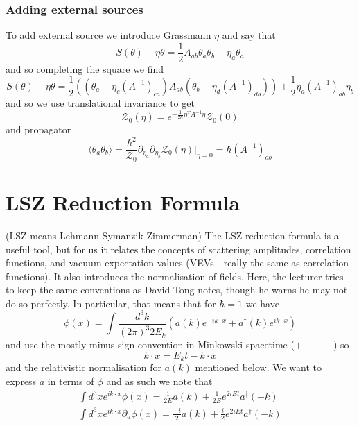\documentclass{article}
\theoremstyle{definition}
\begin{document}
\subsubsection{Adding external sources}

To add external source we introduce Grassmann $\eta$ and say that
\begin{equation}
  S(\theta) - \eta \theta = \frac{1}{2} A_{ab} \theta_a \theta_b - \eta_a \theta_a
\end{equation}
and so completing the square we find
\begin{equation}
  S(\theta) - \eta \theta = \frac{1}{2} ((\theta_a - \eta_c (A^{-1})_{ca}) A_{ab}
  (\theta_b - \eta_d (A^{-1})_{db})) + \frac{1}{2} \eta_a (A^{-1})_{ab} \eta_b
\end{equation}
and so we use translational invariance to get
\begin{equation}
  \mathcal{Z}_0(\eta) = e^{-\frac{1}{2\hbar} \eta^T A^{-1} \eta}
  \mathcal{Z}_0(0)
\end{equation}
and propagator
\begin{equation}
  \langle \theta_a \theta_b \rangle = \frac{\hbar^2}{\mathcal{Z}_0} \partial_{\eta_a}
  \partial_{\eta_b} \mathcal{Z}_0(\eta) |_{\eta = 0} = \hbar (A^{-1})_{ab}
\end{equation}

\section{LSZ Reduction Formula}

(LSZ means Lehmann-Symanzik-Zimmerman) The LSZ reduction formula is a useful
tool, but for us it relates the concepts of scattering amplitudes, correlation
functions, and vacuum expectation values (VEVs - really the same as correlation
functions). It also introduces the normalisation of fields. Here, the lecturer
tries to keep the same conventions as David Tong notes, though he warns he may
not do so perfectly. In particular, that means that for $\hbar = 1$ we have
\begin{equation}
  \phi(x) = \int \frac{d^3k}{(2\pi)^3 2 E_k} \left( a(k) e^{-ik \cdot x} +
    a^\dagger(k) e^{ik \cdot x} \right)
\end{equation}
and use the mostly minus sign convention in Minkowski spacetime ($+---$) so
\begin{equation}
  k \cdot x = E_k t - k \cdot x
\end{equation}
and the relativistic normalisation for $a(k)$ mentioned below. We want to
express $a$ in terms of $\phi$ and as such we note that
\begin{align}
  \int d^3x e^{ik \cdot x} \phi(x) = \frac{1}{2E} a(k) +
  \frac{1}{2E} e^{2iEt} a^\dagger(-k) \\
  \int d^3x e^{ik \cdot x} \partial_a \phi(x) = \frac{-i}{2} a(k) +
  \frac{i}{2} e^{2iEt} a^\dagger(-k)
\end{align}
\end{document}
